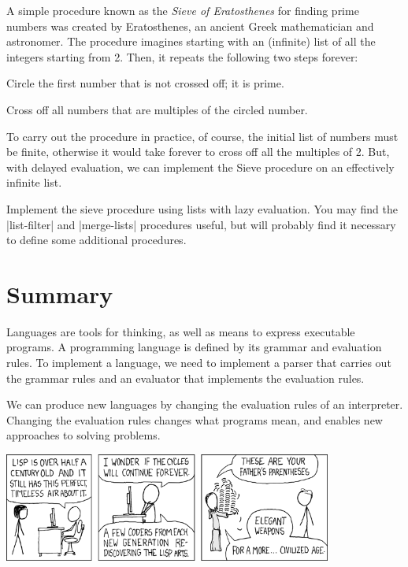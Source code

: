 \begin{schemeregion}
\beforesplitex
\begin{exercise}\doublegoldstar
A simple procedure known as the \emph{Sieve of Eratosthenes} for finding prime numbers was created by Eratosthenes, an ancient Greek mathematician and astronomer.  The procedure imagines starting with an (infinite) list of all the integers starting from 2.  Then, it repeats the following two steps forever:
\begin{enumtight}
\item Circle the first number that is not crossed off; it is prime.
\item Cross off all numbers that are multiples of the circled number.
\end{enumtight}
To carry out the procedure in practice, of course, the initial list of numbers must be finite, otherwise it would take forever to cross off all the multiples of 2.  But, with delayed evaluation, we can implement the Sieve procedure on an effectively infinite list.  

Implement the sieve procedure using lists with lazy evaluation.  You may find the \scheme|list-filter| and \scheme|merge-lists| procedures useful, but will probably find it necessary to define some additional procedures.
\solution{\LATER{}}
\end{exercise}
\aftersplitex

\end{schemeregion}

\section{Summary}

Languages are tools for thinking, as well as means to express executable programs.  A programming language is defined by its grammar and evaluation rules.  To implement a language, we need to implement a parser that carries out the grammar rules and an evaluator that implements the evaluation rules.  

We can produce new languages by changing the evaluation rules of an interpreter.  Changing the evaluation rules changes what programs mean, and enables new approaches to solving problems.

\vspace*{5ex}

{\centering
\includegraphics[width=4.25in]{images/lisp_cycles.png} \\
}

